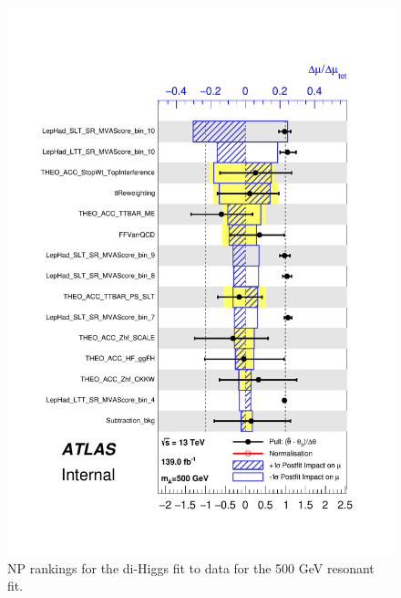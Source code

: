\begin{figure}
\centering
\includegraphics[width=.8\textwidth]{figures/results/HH/LepHad/pulls_SigXsecOverSM_500.pdf}
\caption{NP rankings for the di-Higgs \lephad fit to data for the 500 GeV resonant fit.}
\label{fig:LepHadPostfitNPRankings2HDM500}
\end{figure}

